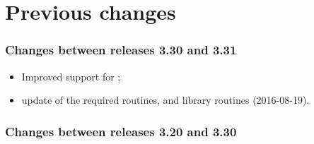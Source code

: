 \documentclass[12pt,twoside]{article}
\newcommand{\mysmaller}{%
\latexhtml{\scriptsize}{\normalsize}}
\newcommand{\compresstext}{%
\latexhtml{%
\setlength{\parsep}{-3ex}%
\setlength{\topsep}{0ex}%
\setlength{\parskip}{0ex}}{}}
\begin{document}
\section{Previous changes}
{\mysmaller%
\compresstext
\subsubsection{Changes between releases 3.30 and 3.31}
\begin{itemize}
	\item Improved support for ;
	\item update of the required
    routines, and  library
    routines (2016-08-19).
\end{itemize}

\subsubsection{Changes between releases 3.20 and 3.30}
\begin{itemize}


\end{itemize}}
\end{document}
